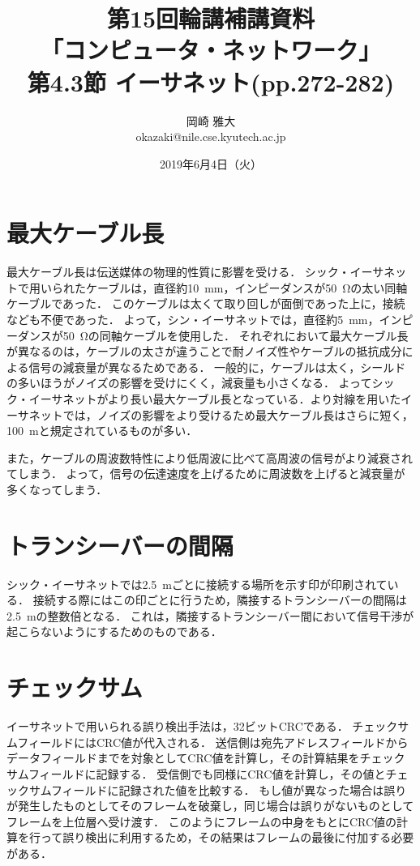 \documentclass[a4paper]{ltjsarticle}
\title{第15回輪講補講資料\\
「コンピュータ・ネットワーク」\\
第4.3節 イーサネット(pp.272-282)}
\author{岡崎 雅大 \\
okazaki@nile.cse.kyutech.ac.jp}
\date{2019年6月4日（火）}
\begin{document}
\maketitle

\section{最大ケーブル長}\label{ux6700ux5927ux30b1ux30fcux30d6ux30ebux9577}

最大ケーブル長は伝送媒体の物理的性質に影響を受ける．
シック・イーサネットで用いられたケーブルは，直径約\SI{10}{mm}，インピーダンスが\SI{50}{\ohm}の太い同軸ケーブルであった．
このケーブルは太くて取り回しが面倒であった上に，接続なども不便であった．
よって，シン・イーサネットでは，直径約\SI{5}{mm}，インピーダンスが\SI{50}{\ohm}の同軸ケーブルを使用した．
それぞれにおいて最大ケーブル長が異なるのは，ケーブルの太さが違うことで耐ノイズ性やケーブルの抵抗成分による信号の減衰量が異なるためである．
一般的に，ケーブルは太く，シールドの多いほうがノイズの影響を受けにくく，減衰量も小さくなる．
よってシック・イーサネットがより長い最大ケーブル長となっている．より対線を用いたイーサネットでは，ノイズの影響をより受けるため最大ケーブル長はさらに短く，\SI{100}{m}と規定されているものが多い．

また，ケーブルの周波数特性により低周波に比べて高周波の信号がより減衰されてしまう．
よって，信号の伝達速度を上げるために周波数を上げると減衰量が多くなってしまう．

\section{トランシーバーの間隔}\label{ux30c8ux30e9ux30f3ux30b7ux30fcux30d0ux30fcux306eux9593ux9694}

シック・イーサネットでは\SI{2.5}{m}ごとに接続する場所を示す印が印刷されている．
接続する際にはこの印ごとに行うため，隣接するトランシーバーの間隔は\SI{2.5}{m}の整数倍となる．
これは，隣接するトランシーバー間において信号干渉が起こらないようにするためのものである．

\section{チェックサム}\label{ux30c1ux30a7ux30c3ux30afux30b5ux30e0}

イーサネットで用いられる誤り検出手法は，32ビットCRCである．
チェックサムフィールドにはCRC値が代入される．
送信側は宛先アドレスフィールドからデータフィールドまでを対象としてCRC値を計算し，その計算結果をチェックサムフィールドに記録する．
受信側でも同様にCRC値を計算し，その値とチェックサムフィールドに記録された値を比較する．
もし値が異なった場合は誤りが発生したものとしてそのフレームを破棄し，同じ場合は誤りがないものとしてフレームを上位層へ受け渡す．
このようにフレームの中身をもとにCRC値の計算を行って誤り検出に利用するため，その結果はフレームの最後に付加する必要がある．
\end{document}

